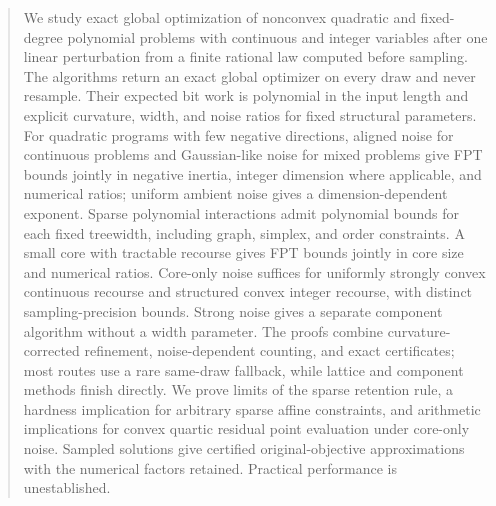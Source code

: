 \begin{abstract}
We study exact global optimization of nonconvex quadratic and fixed-degree
polynomial problems with continuous and integer variables after one linear
perturbation from a finite rational law computed before sampling. The
algorithms return an exact global optimizer on every draw and never
resample. Their expected bit work is polynomial in the input length and
explicit curvature, width, and noise ratios for fixed structural parameters.
For quadratic programs with few negative directions, aligned noise for
continuous problems and Gaussian-like noise for mixed problems give FPT
bounds jointly in negative inertia, integer dimension where applicable,
and numerical ratios; uniform ambient
noise gives a dimension-dependent exponent. Sparse polynomial interactions
admit polynomial bounds for each fixed treewidth, including graph, simplex,
and order constraints. A small core with tractable recourse gives FPT bounds
jointly in core size and numerical ratios. Core-only noise suffices for
uniformly strongly convex continuous recourse and structured convex integer
recourse, with distinct sampling-precision bounds. Strong noise gives a
separate component algorithm without a width parameter. The proofs combine
curvature-corrected refinement, noise-dependent counting, and exact
certificates; most routes use a rare same-draw fallback, while lattice and
component methods finish directly. We prove limits of the sparse retention
rule, a hardness implication for arbitrary sparse affine constraints, and
arithmetic implications for convex quartic residual point evaluation under
core-only noise. Sampled solutions give certified original-objective
approximations with the numerical factors retained. Practical performance
is unestablished.
\end{abstract}
